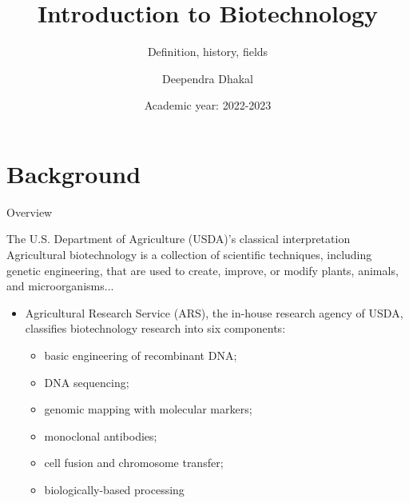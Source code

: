 \documentclass[
  ignorenonframetext,
  aspectratio=169]{beamer}
\title{Introduction to Biotechnology}
\subtitle{Definition, history, fields}
\author{Deependra Dhakal}
\date{Academic year: 2022-2023}
\institute{CNRM-Tikapur \and AFU}
\providecommand{\tightlist}{%
  \setlength{\itemsep}{0pt}\setlength{\parskip}{0pt}}
\begin{document}
\frame{\titlepage}

\begin{frame}[allowframebreaks]
  \tableofcontents[hideallsubsections]
\end{frame}
\hypertarget{background}{%
\section{Background}\label{background}}

\begin{frame}{Overview}
\protect\hypertarget{overview}{}
\begin{block}{The U.S. Department of Agriculture (USDA)'s classical interpretation}
Agricultural biotechnology is a collection of scientific techniques, including genetic engineering, that are used to create, improve, or modify plants, animals, and microorganisms...
\end{block}

\begin{itemize}
\tightlist
\item
  Agricultural Research Service (ARS), the in-house research agency of
  USDA, classifies biotechnology research into six components:

  \begin{itemize}
  \tightlist
  \item
    basic engineering of recombinant DNA;
  \item
    DNA sequencing;
  \item
    genomic mapping with molecular markers;
  \item
    monoclonal antibodies;
  \item
    cell fusion and chromosome transfer;
  \item
    biologically-based processing
  \end{itemize}
\end{itemize}
\end{frame}
\end{document}
